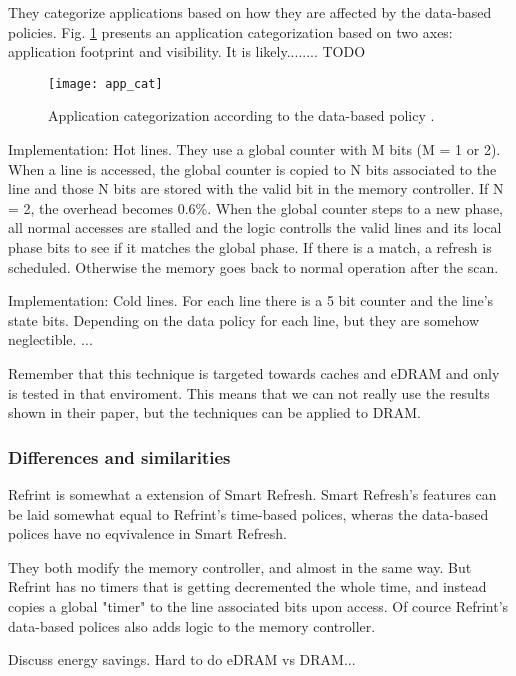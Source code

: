 They categorize applications based on how they are affected by the data-based policies. Fig. \ref{fig:app_cat} presents an application categorization based on two axes: application footprint and visibility. It is likely........ TODO

\begin{figure}[t!]
	\texttt{[image: app\_cat]}
	\caption{Application categorization according to the data-based policy \cite{refrint}.}
	\label{fig:app_cat}
\end{figure}

Implementation: Hot lines. They use a global counter with M bits (M = 1 or 2). When a line is accessed, the global counter is copied to N bits associated to the line and those N bits are stored with the valid bit in the memory controller. If N = 2, the overhead becomes 0.6\%. When the global counter steps to a new phase, all normal accesses are stalled and the logic controlls the valid lines and its local phase bits to see if it matches the global phase. If there is a match, a refresh is scheduled. Otherwise the memory goes back to normal operation after the scan. 

Implementation: Cold lines. For each line there is a 5 bit counter and the line's state bits. Depending on the data policy  for each line, but they are somehow neglectible.  ...

Remember that this technique is targeted towards caches and eDRAM and only is tested in that enviroment. This means that we can not really use the results shown in their paper, but the techniques can be applied to DRAM.

\subsubsection*{Differences and similarities}

Refrint is somewhat a extension of Smart Refresh. Smart Refresh's features can be laid somewhat equal to Refrint's time-based polices, wheras the data-based polices have no eqvivalence in Smart Refresh.

They both modify the memory controller, and almost in the same way. But Refrint has no timers that is getting decremented the whole time, and instead copies a global "timer" to the line associated bits upon access. Of cource Refrint's data-based polices also adds logic to the memory controller.

Discuss energy savings. Hard to do eDRAM vs DRAM...

